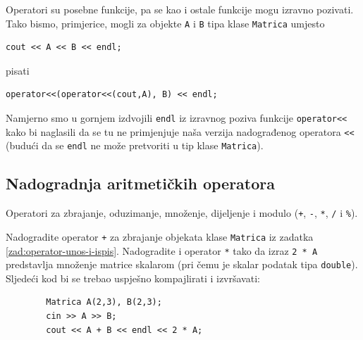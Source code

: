 Operatori su posebne funkcije, pa se kao i ostale
funkcije mogu izravno pozivati.
Tako bismo, primjerice, mogli za objekte \texttt{A} i \texttt{B} tipa klase \texttt{Matrica} umjesto
\begin{verbatim}
cout << A << B << endl;
\end{verbatim}
pisati
\begin{verbatim}
operator<<(operator<<(cout,A), B) << endl;
\end{verbatim}
Namjerno smo u gornjem izdvojili \texttt{endl}
iz izravnog poziva funkcije \texttt{operator<\!<}
kako bi naglasili da se tu ne primjenjuje naša
verzija nadograđenog operatora \texttt{<\!<}
(budući da se \texttt{endl} ne može pretvoriti u tip klase \texttt{Matrica}).


\subsection{Nadogradnja aritmetičkih operatora}

Operatori za zbrajanje, oduzimanje, množenje, dijeljenje i modulo (\texttt{+}, \texttt{-}, \texttt{*}, \texttt{/} i \texttt{\%}).

\begin{zadatak}\label{zad:matrice-aritmetika}
    Nadogradite operator \texttt{+} za zbrajanje objekata klase \texttt{Matrica}
    iz zadatka \ref{zad:operator-unos-i-ispis}.
    Nadogradite i operator \texttt{*}
    tako da izraz \texttt{2 * A} predstavlja množenje matrice skalarom (pri čemu je skalar podatak tipa \texttt{double}).
    Sljedeći kod bi se trebao uspješno kompajlirati i izvršavati:
    \begin{verbatim}
        Matrica A(2,3), B(2,3);
        cin >> A >> B;
        cout << A + B << endl << 2 * A;
    \end{verbatim}
\end{zadatak}


